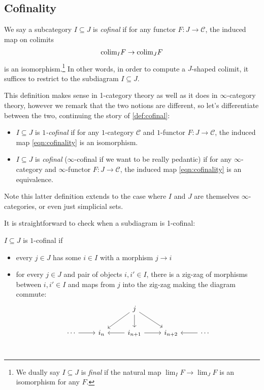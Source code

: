 \subsection{Cofinality}
\begin{definition}\label{def:cofinal} 
We say a subcategory $I \subseteq J$ is \textit{cofinal} if for any functor $F \colon J \to \mathscr{C}$, the induced map on colimits
\begin{equation}\label{eqn:cofinality}
\begin{aligned}
    \mathrm{colim}_I F \to \mathrm{colim}_J F
\end{aligned}
\end{equation}
is an isomorphism.\footnote{%
We dually say $I \subseteq J$ is \textit{final} if the natural map $\lim_I F \to \lim_J F$ is an isomorphism for any $F$.%
}
In other words, in order to compute a $J$-shaped colimit, it suffices to restrict to the subdiagram $I \subseteq J$.
\end{definition}

\begin{remark} This definition makes sense in 1-category theory as well as it does in $\infty$-category theory, however we remark that the two notions are different, so let's differentiate between the two, continuing the story of \autoref{def:cofinal}:
\begin{itemize}
    \item $I \subseteq J$ is $1$\textit{-cofinal} if for any $1$-category $\mathscr{C}$ and $1$-functor $F \colon J \to \mathscr{C}$, the induced map \autoref{eqn:cofinality} is an isomorphism.
    \item $I \subseteq J$ is \textit{cofinal} ($\infty$-cofinal if we want to be really pedantic) if for any $\infty$-category and $\infty$-functor $F \colon J \to \mathscr{C}$, the induced map \autoref{eqn:cofinality} is an equivalence.
\end{itemize}
Note this latter definition extends to the case where $I$ and $J$ are themselves $\infty$-categories, or even just simplicial sets.

\end{remark}

It is straightforward to check when a subdiagram is 1-cofinal:
\begin{proposition} \cite[04E6]{Stacks}
$I \subseteq J$ is $1$-cofinal if
\begin{itemize}
    \item every $j\in J$ has some $i \in I$ with a morphism $j \to i$
    \item for every $j \in J$ and pair of objects $i,i'\in I$, there is a zig-zag of morphisms between $i,i'\in I$ and maps from $j$ into the zig-zag making the diagram commute:
\[ \begin{tikzcd}
     &  & j\dar\ar[dr]\ar[dl] &  & \\
    \cdots\rar & i_n & i_{n+1}\lar\rar & i_{n+2} & \lar\cdots \\
\end{tikzcd} \]
\end{itemize}
\end{proposition}

